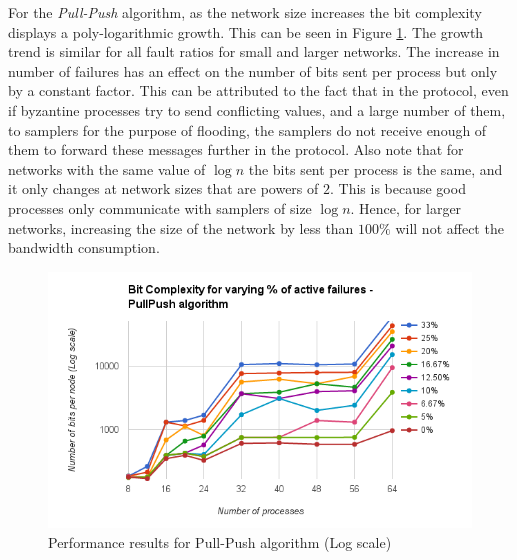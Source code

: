 For the \textit{Pull-Push} algorithm, as the network size increases the bit
complexity displays a poly-logarithmic growth. This can be seen in Figure 
\ref{fig:pull_push}. The growth trend is similar for all fault ratios for small
and larger networks. The increase in number of failures has an effect on the
number of bits sent per process but only by a constant factor. This can be
attributed to the fact that in the protocol, even if byzantine processes try to
send conflicting values, and a large number of them, to samplers for the
purpose of flooding, the samplers do not receive enough of them to forward
these messages further in the protocol. Also note that for networks with the
same value of $\log n$ the bits sent per process is the same, and it only changes
at network sizes that are powers of $2$. This is because good processes only
communicate with samplers of size $\log n$. Hence, for larger networks,
increasing the size of the network by less than $100\%$ will not affect the
bandwidth consumption.  
\begin{figure}[ht] \centering 
    \vspace{-2mm}
    \includegraphics[scale=0.4]{pull_push} 
    \caption{Performance
    results for Pull-Push algorithm (Log scale)} \label{fig:pull_push}
    \vspace{-4mm}
    \end{figure}

